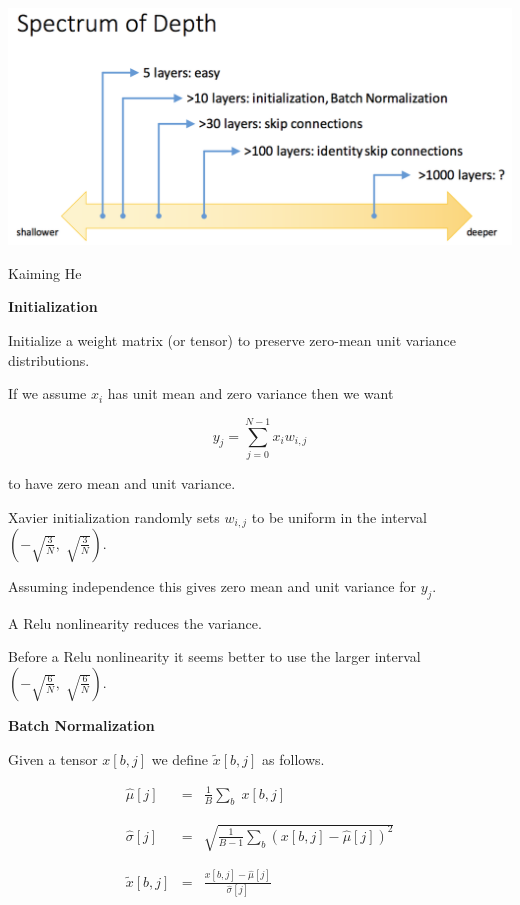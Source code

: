 {

\centerline{\includegraphics[width = 9in]{../images/DepthSpectrum}}

\centerline{\large Kaiming He}

\slide{}
\centerline{\bf Initialization}
\vfill


Initialize a weight matrix (or tensor) to preserve zero-mean unit variance distributions.

\vfill
If we assume $x_i$ has unit mean and zero variance then we want

\vfill
$$y_j = \sum_{j=0}^{N-1} x_i w_{i,j}$$

\vfill
to have zero mean and unit variance.

\vfill
Xavier initialization randomly sets $w_{i,j}$ to be uniform in the interval $\left(-\sqrt{\frac{3}{N}},\;\sqrt{\frac{3}{N}}\right)$.

\vfill
Assuming independence this gives zero mean and unit variance for $y_j$.


A Relu nonlinearity reduces the variance.

\vfill
Before a Relu nonlinearity it seems better to use the larger interval $\left(-\sqrt{\frac{6}{N}},\;\sqrt{\frac{6}{N}}\right)$.

\slide{}
\centerline{\bf Batch Normalization}
\vfill

Given a tensor $x[b,j]$ we define $\tilde{x}[b,j]$ as follows.

\begin{eqnarray*}
  \hat{\mu}[j] & = & \frac{1}{B} \sum_b\;x[b,j] \\
  \\
  \\
  \hat{\sigma}[j] & = & \sqrt{\frac{1}{B-1} \sum_b (x[b,j]-\hat{\mu}[j])^2} \\
  \\
  \\
  \tilde{x}[b,j]& = & \frac{x[b,j] - \hat{\mu}[j]}{\hat{\sigma}[j]}
\end{eqnarray*}


}
